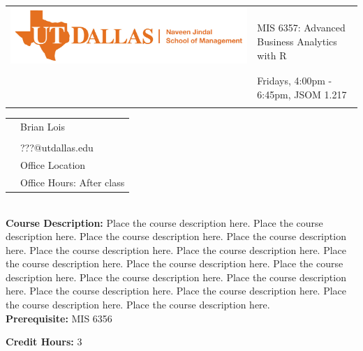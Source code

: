 \documentclass[11pt]{article}
\begin{document}
\begin{tabular}{ l l }
  \multirow{3}{*}{\includegraphics[scale=.3]{UTD_SOM_logo.jpg}} & \LARGE  \\\\
  & \LARGE MIS 6357: Advanced Business Analytics with R \\\\
  & \LARGE Fridays, 4:00pm - 6:45pm, JSOM 1.217 \\\\
\end{tabular}
\vspace{10mm}

\begin{tabular}{ l l }
 & \large Brian Lois \\\\
  & \large ???@utdallas.edu \\
  & \large Office Location \\
  & \large Office Hours: After class \\
\end{tabular}
\vspace{5mm}

\textbf {\large \\ Course Description:} Place the course description here. Place the course description here. Place the course description here. Place the course description here. Place the course description here. Place the course description here. Place the course description here. Place the course description here. Place the course description here. Place the course description here. Place the course description here. Place the course description here. Place the course description here. Place the course description here. Place the course description here. \\
\textbf {Prerequisite:} MIS 6356

\textbf {Credit Hours:} 3 \\
\end{document}
